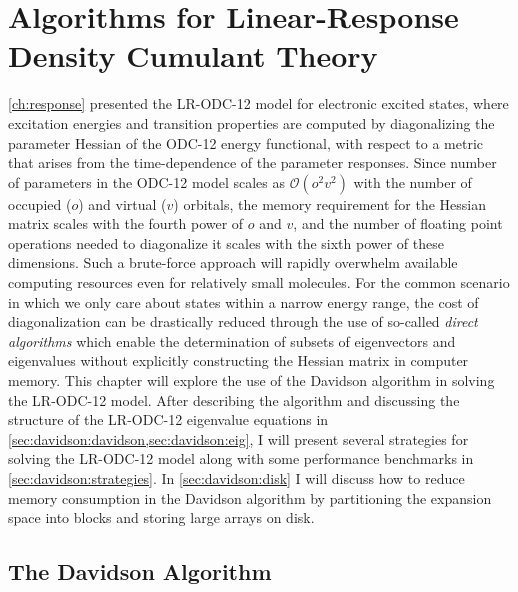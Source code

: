 \chapter[%
    Algorithms for Linear-Response Density Cumulant Theory
]{%
    Algorithms for Linear-Response Density Cumulant Theory
}
\label{ch:davidson}

\cref{ch:response} presented the LR-ODC-12 model for electronic excited states,
where excitation energies and transition properties are computed by
diagonalizing the parameter Hessian of the ODC-12 energy functional, with
respect to a metric that arises from the time-dependence of the parameter
responses.
Since number of parameters in the ODC-12 model scales as
\(
    \mathcal{O}(o^2v^2)
\)
with the number of occupied (\(o\)) and virtual (\(v\)) orbitals, the
memory requirement for the Hessian matrix scales with the fourth power
of \(o\) and \(v\), and the number of floating point operations needed
to diagonalize it scales with the sixth power of these dimensions.
Such a brute-force approach will rapidly overwhelm available computing
resources even for relatively small molecules.
For the common scenario in which we only care about states within a narrow
energy range, the cost of diagonalization can be drastically reduced through the
use of so-called {\itshape direct algorithms} which enable the determination of
subsets of eigenvectors and eigenvalues without explicitly constructing the
Hessian matrix in computer memory.
This chapter will explore the use of the Davidson
algorithm\cite{Liu:1978p49,Davidson:1975p87} in solving the LR-ODC-12 model.
After describing the algorithm and discussing the structure of the LR-ODC-12
eigenvalue equations in \cref{sec:davidson:davidson,sec:davidson:eig}, I will
present several strategies for solving the LR-ODC-12 model along with some
performance benchmarks in \cref{sec:davidson:strategies}.
In \cref{sec:davidson:disk} I will discuss how to reduce memory consumption in
the Davidson algorithm by partitioning the expansion space into blocks and
storing large arrays on disk.


\section{The Davidson Algorithm}
\label{sec:davidson:davidson}

